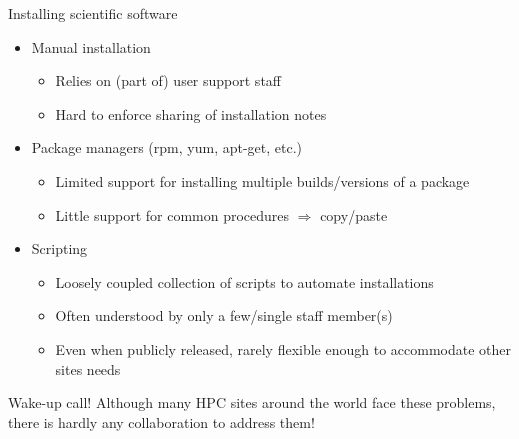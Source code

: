 \documentclass[10pt,xcolor={usenames,dvipsnames}]{beamer}
\begin{document}
\begin{frame}{Installing scientific software}
\begin{itemize}
    \item
        Manual installation
        \begin{itemize}
            \item
                Relies on (part of) user support staff
            \item
                Hard to enforce sharing of installation notes
        \end{itemize}
    \item
        Package managers (rpm, yum, apt-get, etc.)
        \begin{itemize}
            \item
                Limited support for installing multiple builds/versions of a
                package
            \item
                Little support for common procedures $\Rightarrow$ copy/paste
        \end{itemize}
    \item
        Scripting
        \begin{itemize}
            \item
                Loosely coupled collection of scripts to automate installations
            \item
                Often understood by only a few/single staff member(s)
            \item
                Even when publicly released, rarely flexible enough to
                accommodate other sites needs
        \end{itemize}
\end{itemize}
\begin{center}
    \begin{minipage}{0.9\textwidth}
        \begin{alertblock}{Wake-up call!}
            \footnotesize
            Although many HPC sites around the world face these problems,
            there is hardly any collaboration to address them!
        \end{alertblock}
    \end{minipage}
\end{center}
\end{frame}

\end{document}
